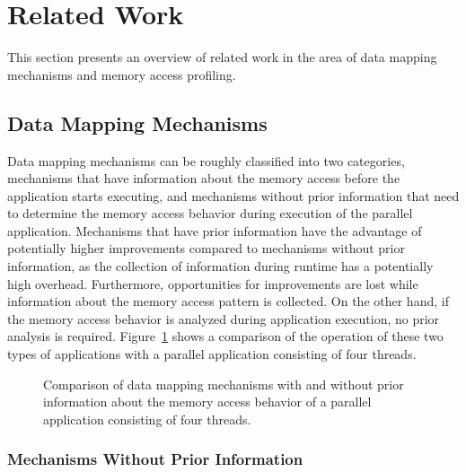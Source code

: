 
\section{Related Work}
\label{sec:soa}

This section presents an overview of related work in the area of data mapping mechanisms and memory access profiling.

\subsection{Data Mapping Mechanisms}
\label{sec:soa-mapping}

Data mapping mechanisms can be roughly classified into two categories, mechanisms that have information about the memory access before the application starts executing, and mechanisms without prior information that need to determine the memory access behavior during execution of the parallel application.
Mechanisms that have prior information have the advantage of potentially higher improvements compared to mechanisms without prior information, as the collection of information during runtime has a potentially high overhead.
Furthermore, opportunities for improvements are lost while information about the memory access pattern is collected.
On the other hand, if the memory access behavior is analyzed during application execution, no prior analysis is required.
Figure~\ref{fig:timeline} shows a comparison of the operation of these two types of applications with a parallel application consisting of four threads.

\begin{figure}[!b]
    
    \caption{Comparison of data mapping mechanisms with and without prior information about the memory access behavior of a parallel application consisting of four threads.}
    \label{fig:timeline}
\end{figure}

\subsubsection{Mechanisms Without Prior Information}

